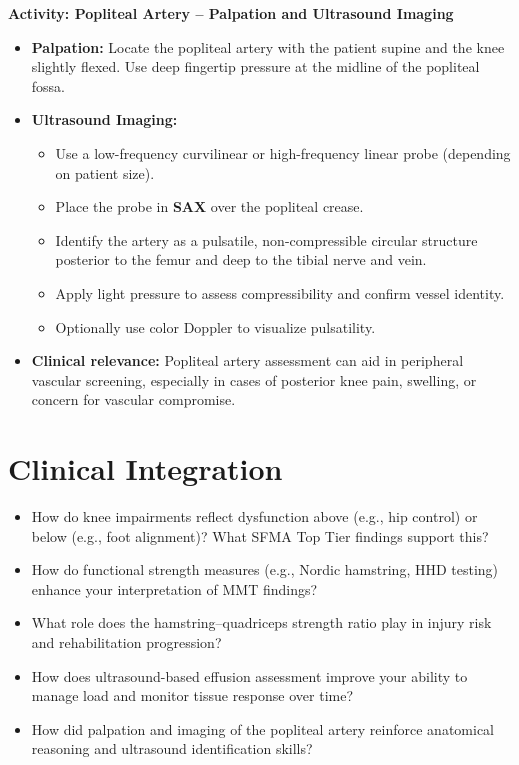 \begin{labactivitybox}
\textbf{Activity: Popliteal Artery – Palpation and Ultrasound Imaging}

\begin{itemize}
  \item \textbf{Palpation:} Locate the popliteal artery with the patient supine and the knee slightly flexed. Use deep fingertip pressure at the midline of the popliteal fossa.
  \item \textbf{Ultrasound Imaging:}
    \begin{itemize}
      \item Use a low-frequency curvilinear or high-frequency linear probe (depending on patient size).
      \item Place the probe in \textbf{SAX} over the popliteal crease.
      \item Identify the artery as a pulsatile, non-compressible circular structure posterior to the femur and deep to the tibial nerve and vein.
      \item Apply light pressure to assess compressibility and confirm vessel identity.
      \item Optionally use color Doppler to visualize pulsatility.
    \end{itemize}
  \item \textbf{Clinical relevance:} Popliteal artery assessment can aid in peripheral vascular screening, especially in cases of posterior knee pain, swelling, or concern for vascular compromise.
\end{itemize}
\end{labactivitybox}

\section*{Clinical Integration}

\begin{itemize}
  \item How do knee impairments reflect dysfunction above (e.g., hip control) or below (e.g., foot alignment)? What SFMA Top Tier findings support this?
  \item How do functional strength measures (e.g., Nordic hamstring, HHD testing) enhance your interpretation of MMT findings?
  \item What role does the hamstring–quadriceps strength ratio play in injury risk and rehabilitation progression?
  \item How does ultrasound-based effusion assessment improve your ability to manage load and monitor tissue response over time?
  \item How did palpation and imaging of the popliteal artery reinforce anatomical reasoning and ultrasound identification skills?
\end{itemize}

